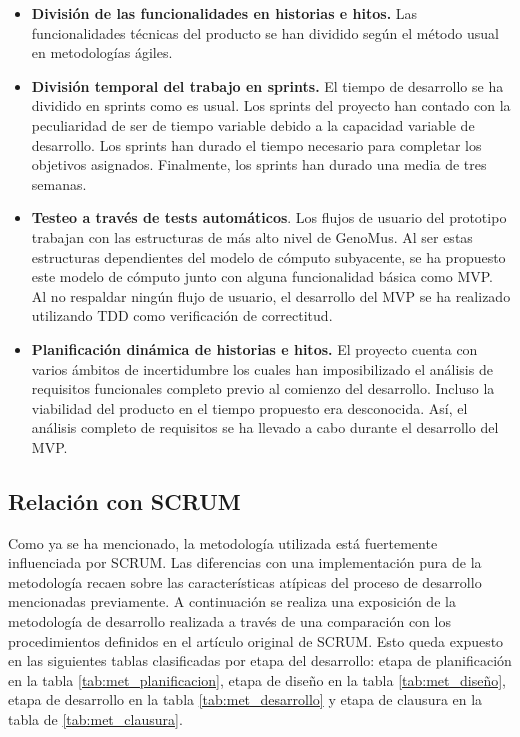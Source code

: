 \begin{itemize}
    \item \textbf{División de las funcionalidades en historias e hitos.} Las funcionalidades técnicas del producto se han dividido según el método usual en metodologías ágiles. 
    
    \item \textbf{División temporal del trabajo en sprints.} El tiempo de desarrollo se ha dividido en sprints como es usual. Los sprints del proyecto han contado con la peculiaridad de ser de tiempo variable debido a la capacidad variable de desarrollo. Los sprints han durado el tiempo necesario para completar los objetivos asignados. Finalmente, los sprints han durado una media de tres semanas.

    \item \textbf{Testeo a través de tests automáticos}. Los flujos de usuario del prototipo trabajan con las estructuras de más alto nivel de GenoMus. Al ser estas estructuras dependientes del modelo de cómputo subyacente, se ha propuesto este modelo de cómputo junto con alguna funcionalidad básica como MVP. Al no respaldar ningún flujo de usuario, el desarrollo del MVP se ha realizado utilizando TDD como verificación de correctitud.
    
    \item \textbf{Planificación dinámica de historias e hitos.} El proyecto cuenta con varios ámbitos de incertidumbre los cuales han imposibilizado el análisis de requisitos funcionales completo previo al comienzo del desarrollo. Incluso la viabilidad del producto en el tiempo propuesto era desconocida. Así, el análisis completo de requisitos se ha llevado a cabo durante el desarrollo del MVP.
\end{itemize}

\subsection{Relación con SCRUM}

Como ya se ha mencionado, la metodología utilizada está fuertemente influenciada por SCRUM. Las diferencias con una implementación pura de la metodología recaen sobre las características atípicas del proceso de desarrollo mencionadas previamente. A continuación se realiza una exposición de la metodología de desarrollo realizada a través de una comparación con los procedimientos definidos en el artículo original de SCRUM\cite{scrum}. Esto queda expuesto en las siguientes tablas clasificadas por etapa del desarrollo: etapa de planificación en la tabla \ref{tab:met_planificacion}, etapa de diseño en la tabla \ref{tab:met_diseño}, etapa de desarrollo en la tabla \ref{tab:met_desarrollo} y etapa de clausura en la tabla de \ref{tab:met_clausura}.


